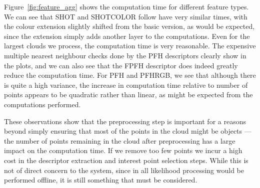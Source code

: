 \documentclass[11pt,a4paper]{kth-mag}
\begin{document}
Figure~\ref{fig:feature_agg} shows the computation time for different feature
types. We can see that SHOT and SHOTCOLOR follow have very similar times, with
the colour extension slightly shifted from the basic version, as would be
expected, since the extension simply adds another layer to the computations.
Even for the largest clouds we process, the computation time is very reasonable.
The expensive multiple nearest neighbour checks done by the PFH descriptors
clearly show in the plots, and we can also see that the FPFH descriptor does
indeed greatly reduce the computation time. For PFH and PFHRGB, we see that
although there is quite a high variance, the increase in computation time
relative to number of points appears to be quadratic rather than linear, as
might be expected from the computations performed.

These observations show that the preprocessing step is important for a reasons
beyond simply ensuring that most of the points in the cloud might be objects ---
the number of points remaining in the cloud after preprocessing has a large
impact on the computation time. If we remove too few points we incur a high cost
in the descriptor extraction and interest point selection steps. While this is
not of direct concern to the system, since in all likelihood processing would be
performed offline, it is still something that must be considered.
\end{document}
